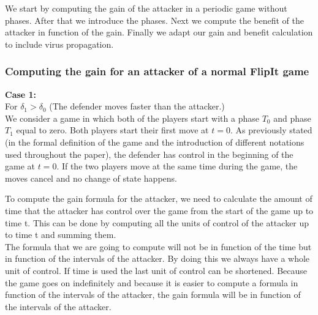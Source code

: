  
%
%

We  start by computing the gain of the attacker in a periodic game without phases. After that we introduce the phases. Next we compute the benefit of the attacker in function of the gain. Finally we adapt our gain and benefit calculation to include virus propagation. 
\\
\subsubsection{Computing the gain for an attacker of a normal FlipIt game}
\textbf{Case  1:} \\
For $\delta_{1} > \delta_{0}$ (The defender moves faster than the attacker.) \\

We consider a game in which both of the players start with a phase $T_{0}$ and phase $T_{1}$ equal to zero. Both players start their first move at $t=0$. As previously stated (in the formal definition of the game and the introduction of different notations used throughout the paper), the defender has control in the beginning of the game at $t=0$. If the two players move at the same time during the game, the moves cancel and no change of state happens. \\ 

To compute the gain formula for the attacker, we need to calculate the amount of time that the attacker has control over the game from the start of the game up to time t. This can be done by computing all the units of control of the attacker up to time t  and summing them. \\
The formula that we are going to compute will not be in function of the time but in function of the intervals of the attacker. By doing this we always have a whole unit of control. If time is used the last unit of control can be shortened. Because the game goes on indefinitely and because it is easier to compute a formula in function of the intervals of the attacker, the gain formula will be in function of the intervals of the attacker. 

